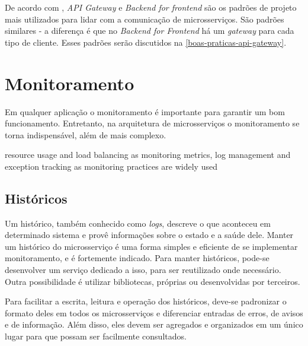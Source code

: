De acordo com , \emph{API Gateway} e \emph{Backend for frontend} são os padrões de projeto mais utilizados para lidar com a comunicação de microsserviços. São padrões similares - a diferença é que no \emph{Backend for Frontend} há um \emph{gateway} para cada tipo de cliente. Esses padrões serão discutidos na \autoref{boas-praticas-api-gateway}. 


\section{Monitoramento}

Em qualquer aplicação o monitoramento é importante para garantir um bom funcionamento. Entretanto, na arquitetura de microsserviços o monitoramento se torna indispensável, além de mais complexo. %

resource usage and load balancing as monitoring metrics, log management and exception tracking as monitoring practices are widely used \cite{design-monitoring-testing-waseem}

\subsection{Históricos}

Um histórico, também conhecido como \emph{logs}, descreve o que aconteceu em determinado sistema e provê informações sobre o estado e a saúde dele. Manter um histórico do microsserviço é uma forma simples e eficiente de se implementar monitoramento, e é fortemente indicado. Para manter históricos, pode-se desenvolver um serviço dedicado a isso, para ser reutilizado onde necessário. Outra possibilidade é utilizar bibliotecas, próprias ou desenvolvidas por terceiros.

Para facilitar a escrita, leitura e operação dos históricos, deve-se padronizar o formato deles em todos os microsserviços e diferenciar entradas de erros, de avisos e de informação. Além disso, eles devem ser agregados e organizados em um único lugar para que possam ser facilmente consultados.



